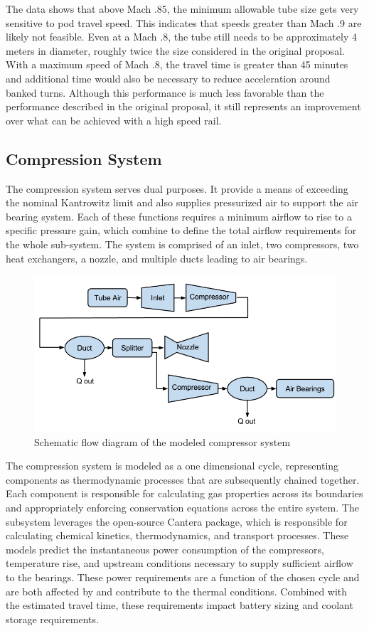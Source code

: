 \documentclass[heading.tex]{subfiles}
\begin{document}
The data shows that above Mach .85, the minimum allowable tube size gets very sensitive to pod travel speed. This indicates that speeds
greater than Mach .9 are likely not feasible. Even at a Mach .8, the tube still needs to be approximately 4 meters in diameter, roughly
twice the size considered in the original proposal. With a maximum speed of Mach .8, the travel time is greater than 45 minutes and
additional time would also be necessary to reduce acceleration around banked turns. Although this performance is much less favorable than the performance
described in the original proposal, it still represents an improvement over what can be achieved with a high speed rail.


\subsection{Compression System}

The compression system serves dual purposes. It provide a means of exceeding the nominal Kantrowitz limit
and also supplies pressurized air to support the air bearing system.
Each of these functions requires a minimum airflow to rise to a specific pressure gain,
which combine to define the total airflow requirements for the whole sub-system.
The system is comprised of an inlet, two compressors, two heat exchangers, a nozzle, and multiple ducts leading to air bearings.

\begin{figure}[hbtp]
\centering
\includegraphics[width=\textwidth]{images/compressor_schematic.png}
\caption{Schematic flow diagram of the modeled compressor system}
\end{figure}

The compression system is modeled as a one dimensional cycle, representing components as thermodynamic processes that are
subsequently chained together. Each component is responsible for calculating gas properties across its boundaries and appropriately
enforcing conservation equations across the entire system. The subsystem leverages the open-source Cantera package, which is 
responsible for calculating chemical kinetics, thermodynamics, and transport processes. These models predict the instantaneous
power consumption of the compressors, temperature rise, and upstream conditions necessary to supply sufficient airflow to the bearings.
These power requirements are a function of the chosen cycle and are both affected by and contribute to the thermal conditions. 
Combined with the estimated travel time, these requirements impact battery sizing and coolant storage requirements.
\end{document}
